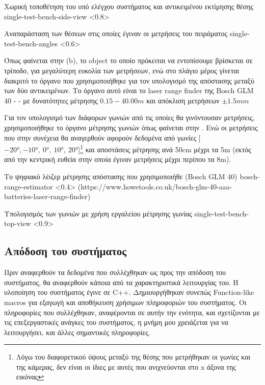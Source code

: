 {Χωρική τοποθέτηση του υπό ελέγχου συστήματος και αντικειμένου εκτίμησης θέσης}%
{single-test-bench-side-view}%
<0.8>

{Αναπαράσταση των θέσεων στις οποίες έγιναν οι μετρήσεις του πειράματος}%
{single-test-bench-angles}%
<0.6>

Όπως φαίνεται στην  (b), το object το οποίο πρόκειται να εντοπίσουμε βρίσκεται σε τρίποδο, για μεγαλύτερη ευκολία των μετρήσεων, ενώ στο πλάγιο μέρος γίνεται διακριτό το όργανο που χρησιμοποιήθηκε για τον υπολογισμό της απόστασης μεταξύ των δύο αντικειμένων. Το όργανο αυτό είναι το laser range finder της Bosch GLM 40 -  - με δυνατότητες μέτρησης $0.15-40.00 m$ και απόκλιση μετρήσεων $\pm1.5mm$

Για τον υπολογισμό των διάφορων γωνιών από τις οποίες θα γινόντουσαν μετρήσεις, χρησιμοποιήθηκε το όργανο μέτρησης γωνιών όπως φαίνεται στην . Ενώ οι μετρήσεις που στην συνέχεια θα αναγερθούν αφορούν δεδομένα από γωνίες [$-20\si{\degree},-10\si{\degree},~0\si{\degree},~10\si{\degree},~20\si{\degree}$]\footnote{Λόγω του διαφορετικού ύψους μεταξύ της θέσης που μετρήθηκαν οι γωνίες και της κάμερας, δεν είναι οι ίδιες με αυτές που ανιχνεύονται στο x άξονα της εικόνας} και αποστάσεις μέτρησης ανά 50cm μέχρι τα 5m (εκτός από την κεντρική ευθεία στην οποία έγιναν μετρήσεις μέχρι περίπου τα 8m).

{Το ψηφιακό λέιζερ μέτρησης απόστασης που χρησιμοποιήθε (Bosch GLM 40)}%
{bosch-range-estimator}%
<0.4>%
(https://www.howetools.co.uk/bosch-glm-40-aaa-batteries-laser-range-finder)

{Υπολογισμός των γωνιών με χρήση εργαλείου μέτρησης γωνίας}%
{single-test-bench-top-view}%
<0.9>

\subsection{Απόδοση του συστήματος} \label{sec:single-expe-system}

Πριν αναφερθούν τα δεδομένα που συλλέχθηκαν ως προς την απόδοση του συστήματος, θα αναφερθούν κάποια από τα 
χαρακτηριστικά λειτουργίας του. Η υλοποίηση του συστήματος έγινε σε C++. Δημιουργήθηκαν συνεπώς Function-like macros για εξαγωγή και αποθήκευση χρήσιμων πληροφοριών του συστήματος. Οι πληροφορίες που συλλέχθηκαν, αναφέρονται σε αυτήν την ενότητα, και σχετίζονται με τις ε\-πε\-ξε\-ργα\-στι\-κές ανάγκες του συστήματος, η μνήμη μου χρειάζεται για να λειτουργήσει, και άλλες σημαντικές πληροφορίες.

